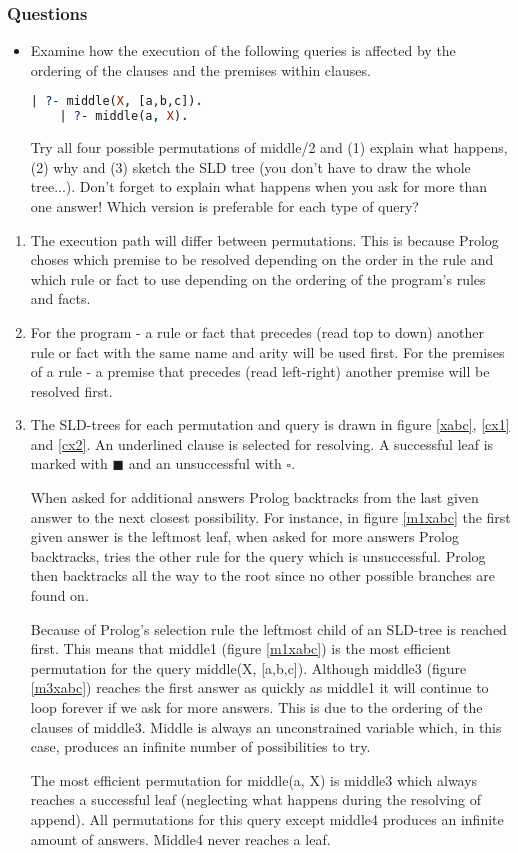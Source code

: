 \subsubsection{Questions}
\begin{itemize}
  \item Examine how the execution of the following queries is affected by the ordering
  of the clauses and the premises within clauses.
  \begin{lstlisting}[language=Prolog]
    | ?- middle(X, [a,b,c]).
    | ?- middle(a, X).
  \end{lstlisting}
  Try all four possible permutations of middle/2 and (1) explain what happens,
  (2) why and (3) sketch the SLD tree (you don’t have to draw the whole
  tree...). Don’t forget to explain what happens when you ask for more than
  one answer! Which version is preferable for each type of query?
\end{itemize}
\begin{enumerate}
  \item The execution path will differ between permutations. This is because Prolog choses which premise to be resolved depending on the order in the rule and which rule or fact to use depending on the ordering of the program's rules and facts.
  \item For the program - a rule or fact that precedes (read top to down) another rule or fact with the same name and arity will be used first. For the premises of a rule - a premise that precedes (read left-right) another premise will be resolved first.
  \item The SLD-trees for each permutation and query is drawn in figure \ref{xabc}, \ref{cx1} and \ref{cx2}. An underlined clause is selected for resolving. A successful leaf is marked with $\blacksquare$ and an unsuccessful with $\square$.
  
  When asked for additional answers Prolog backtracks from the last given answer to the next closest possibility. For instance, in figure \ref{m1xabc} the first given answer is the leftmost leaf, when asked for more answers Prolog backtracks, tries the other rule for the query which is unsuccessful. Prolog then backtracks all the way to the root since no other possible branches are found on.

  Because of Prolog's selection rule the leftmost child of an SLD-tree is reached first. This means that middle1 (figure \ref{m1xabc}) is the most efficient permutation for the query middle(X, [a,b,c]). Although middle3 (figure \ref{m3xabc}) reaches the first answer as quickly as middle1 it will continue to loop forever if we ask for more answers. This is due to the ordering of the clauses of middle3. Middle is always an unconstrained variable which, in this case, produces an infinite number of possibilities to try.

  The most efficient permutation for middle(a, X) is middle3 which always reaches a successful leaf (neglecting what happens during the resolving of append). All permutations for this query except middle4 produces an infinite amount of answers. Middle4 never reaches a leaf.


\end{enumerate}


